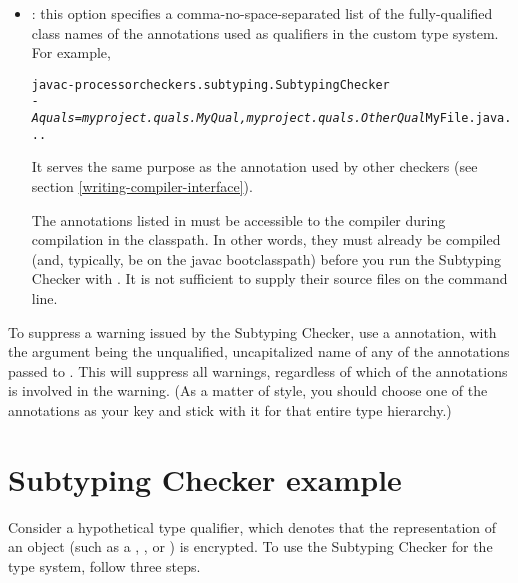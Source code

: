 \begin{itemize}

\item
{}: this option specifies a comma-no-space-separated list of
the fully-qualified class
names of the annotations used as qualifiers in the custom type system.  For
example,

\begin{alltt}
  javac -processor checkers.subtyping.SubtypingChecker
        \textit{-Aquals=myproject.quals.MyQual,myproject.quals.OtherQual} MyFile.java ...
\end{alltt}

It serves the same purpose as the 
annotation used by other checkers (see section
\ref{writing-compiler-interface}).

The annotations listed in  must be accessible to
the compiler during compilation in the classpath.  In other words, they must
already be compiled (and, typically, be on the javac bootclasspath)
before you run the Subtyping Checker with .  It
is not sufficient to supply their source files on the command line.

\end{itemize}

To suppress a warning issued by the Subtyping Checker, use a 
annotation, with the argument being the unqualified, uncapitalized name of
any of the annotations passed to .  This will suppress all
warnings, regardless of which of the annotations is involved in the
warning.  (As a matter of style, you should choose one of the annotations
as your  key and stick with it for that entire type
hierarchy.)


\section{Subtyping Checker example\label{subtyping-example}\label{encrypted-example}}

Consider a hypothetical  type qualifier, which denotes that the
representation of an object (such as a , , or
) is encrypted. To use the Subtyping Checker for the 
type system, follow three steps.


